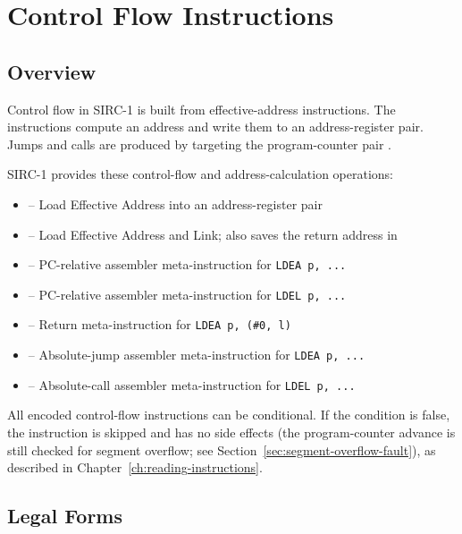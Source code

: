 \chapter{Control Flow Instructions}
\label{ch:control-flow}

\section{Overview}

Control flow in SIRC-1 is built from effective-address instructions. The instructions compute an address and write them
to an address-register pair. Jumps and calls are produced by targeting the program-counter pair .

SIRC-1 provides these control-flow and address-calculation operations:

\begin{itemize}
	\item {} -- Load Effective Address into an address-register pair
	\item {} -- Load Effective Address and Link; also saves the return address in 
	\item {} -- PC-relative assembler meta-instruction for \texttt{LDEA p, ...}
	\item {} -- PC-relative assembler meta-instruction for \texttt{LDEL p, ...}
	\item {} -- Return meta-instruction for \texttt{LDEA p, (\#0, l)}
	\item {} -- Absolute-jump assembler meta-instruction for \texttt{LDEA p, ...}
	\item {} -- Absolute-call assembler meta-instruction for \texttt{LDEL p, ...}
\end{itemize}

All encoded control-flow instructions can be conditional. If the condition is false, the instruction is skipped and has
no side effects (the program-counter advance is still checked for segment overflow; see
Section~\ref{sec:segment-overflow-fault}), as described in Chapter~\ref{ch:reading-instructions}.

\section{Legal Forms}


